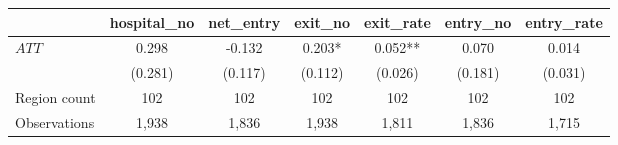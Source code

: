 
\begin{tabular}{lcccccc}
\toprule
 & hospital\_no & net\_entry & exit\_no & exit\_rate & entry\_no & entry\_rate\\
\midrule
$ATT$ & 0.298 & -0.132 & 0.203* & 0.052** & 0.070 & 0.014\\
 & (0.281) & (0.117) & (0.112) & (0.026) & (0.181) & (0.031)\\
\midrule
Region count & 102 & 102 & 102 & 102 & 102 & 102\\
Observations & 1,938 & 1,836 & 1,938 & 1,811 & 1,836 & 1,715\\
\bottomrule
\end{tabular}
